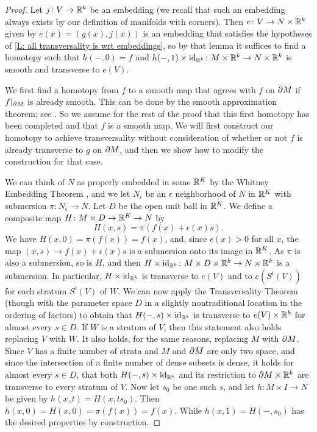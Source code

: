 \begin{remark}
\begin{proof}
	Let $j \colon V\to \mathbb{R}^k$ be an embedding (we recall that such an embedding always exists by our definition of manifolds with corners).
	Then $e \colon V\to N\times \mathbb{R}^k$ given by $e(x)=(g(x),j(x))$ is an embedding that satisfies the hypotheses of \cref{L: all transversality is wrt embeddings}, so by that lemma it suffices to find a homotopy such that $h(-,0)=f$ and $h(-,1)\times \mathrm{id}_{\mathbb{R}^k} \colon M\times \mathbb{R}^k\to N\times \mathbb{R}^k$ is smooth and
	transverse to $e(V)$.

	We first find a homotopy from $f$ to a smooth map that agrees with $f$ on $\partial M$ if $f|_{\partial M}$ is already smooth.
	This can be done by the smooth approximation theorem; see \cite[Theorem III.2.5]{Kos93}.
	So we assume for the rest of the proof that this first homotopy has been completed and that $f$ is a smooth map.
	We will first construct our homotopy to achieve transversality without consideration of whether or not $f$ is already transverse to $g$ on $\partial M$, and then we show how to modify the construction for that case.

	We can think of $N$ as properly embedded in some $\mathbb{R}^K$ by the Whitney Embedding Theorem \cite[Section 1.8]{GuPo74}, and we let $N_\epsilon$ be an $\epsilon$ neighborhood of $N$ in $\mathbb{R}^K$ with submersion $\pi \colon N_\epsilon\to N$.
	Let $D$ be the open unit ball in $\mathbb{R}^K$.
	We define a composite map $H \colon M\times D\to \mathbb{R}^K\to N$ by
	$$H(x,s)=\pi(f(x)+ \epsilon(x)s).$$
	We have $H(x,0)=\pi(f(x))=f(x)$, and, since $\epsilon(x)>0$ for all $x$, the map $(x,s)\to f(x)+ \epsilon(x)s$ is a submersion onto its image in $\mathbb{R}^K$.
	As $\pi$ is also a submersion, so is $H$, and then $H\times \mathrm{id}_{\mathbb{R}^k} \colon M\times D\times \mathbb{R}^k\to N\times \mathbb{R}^k$ is a submersion.
	In particular, $H\times \mathrm{id}_{\mathbb{R}^k}$ is transverse to $e(V)$ and to $e(S^i(V))$ for each stratum $S^i(V)$ of $W$.
	We can now apply the Transversality Theorem (though with the parameter space $D$ in a slightly nontraditional location in the ordering of factors) to obtain that $H(-,s)\times \mathrm{id}_{\mathbb{R}^k}$ is transverse to $e(V)\times \mathbb{R}^k$ for almost every $s\in D$.
	If $W$ is a stratum of $V$, then this statement also holds replacing $V$ with $W$.
	It also holds, for the same reasons, replacing $M$ with $\partial M$.
	Since $V$ has a finite number of strata and $M$ and $\partial M$ are only two space, and since the intersection of a finite number of dense subsets is dense, it holds for almost every $s\in D$, that both $H(-,s)\times \mathrm{id}_{\mathbb{R}^k}$ and its restriction to $\partial M\times \mathbb{R}^k$ are transverse to every stratum of $V$.
	Now let $s_0$ be one such $s$, and let $h \colon M\times I\to N$ be given by $h(x,t)=H(x,ts_0)$.
	Then $h(x,0)=H(x,0)=\pi(f(x))=f(x)$.
	While $h(x,1)=H(-,s_0)$ has the desired properties by construction.


\end{proof}
\end{remark}
